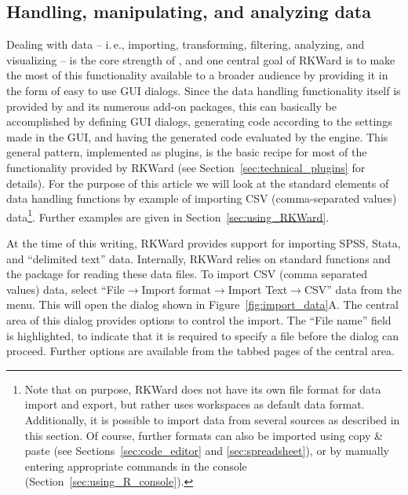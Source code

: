 \subsection{Handling, manipulating, and analyzing data}
\label{sec:analyzing_data}

Dealing with data -- i.\,e., importing, transforming, filtering, analyzing, and visualizing  --
is the core strength of , and one central goal of
RKWard is to make the most of this functionality available to a broader
audience by providing it in the form of easy to use GUI dialogs. Since
the data handling functionality itself is provided by
 and its numerous add-on packages, this
can basically be accomplished by defining GUI dialogs, generating
 code according to the settings made in
the GUI, and having the generated code evaluated by the
 engine. 
This general pattern, implemented as plugins, is the
basic recipe for most of the functionality provided by RKWard
(see Section~\ref{sec:technical_plugins} for details). For
the purpose of this article we will look at the standard
elements of data handling functions by example of importing CSV
(comma-separated values) data\footnote {
  Note that on purpose, RKWard does not have its
  own file format for data import and export, but rather uses
   workspaces as default data format. Additionally, it is possible
  to import data from several sources as described in this section. Of course, further formats can
  also be imported using copy \& paste (see Sections~\ref{sec:code_editor} and \ref{sec:spreadsheet}), or by
  manually entering appropriate  commands in
  the  console (Section~\ref{sec:using_R_console}).
}. Further examples are given in Section~\ref{sec:using_RKWard}.

At the time of this writing, RKWard provides support for importing SPSS, 
Stata, and ``delimited text'' data. Internally, RKWard
relies on standard  functions and the package 
\citep{Murdoch2002} for reading these data files. To import CSV (comma separated values)
data, select ``File$\rightarrow$Import format$\rightarrow$Import Text$\rightarrow$CSV''
data from the menu. This will open the dialog shown in
Figure~\ref{fig:import_data}A. The central area of this dialog provides 
options to control the import. The 
``File name'' field is highlighted, to indicate that
it is required to specify a file before the dialog can proceed.
Further options are available from the tabbed pages of the central area.

